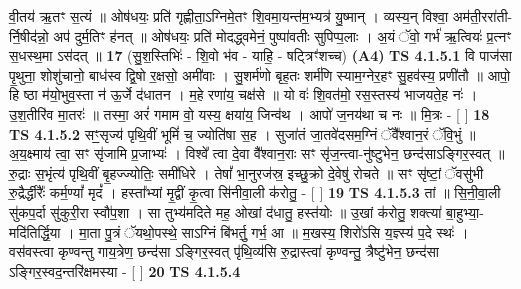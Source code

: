 \documentclass[17pt]{extarticle}
\begin{document}
                  वी॒तय॑ ऋ॒तꣳ स॒त्यं ॥ ओष॑धयः॒ प्रति॑ गृह्णीता॒ऽग्निमे॒तꣳ शि॒वमा॒यन्त॑म॒भ्यत्र॑ यु॒ष्मान् । व्यस्य॒न् विश्वा॒ अम॑ती॒ररा॑ती-र्नि॒षीद॑न्नो॒ अप॑ दुर्म॒तिꣳ ह॑नत् ॥ ओष॑धयः॒ प्रति॑ मोदद्ध्वमेनं॒ पुष्पा॑वतीः सुपिप्प॒लाः । अ॒यं ॅवो॒ गर्भ॑ ऋ॒त्वियः॑ प्र॒त्नꣳ स॒धस्थ॒मा ऽस॑दत् ॥ \textbf{  17} \newline
                  \newline
                      (सु॒श॒स्तिभिः॑ - शि॒वो भ॑व - याहि॒ - षट्त्रिꣳ॑शच्च)  \textbf{(A4)} \newline \newline
                                        \textbf{ TS 4.1.5.1} \newline
                  वि पाज॑सा पृ॒थुना॒ शोशु॑चानो॒ बाध॑स्व द्वि॒षो र॒क्षसो॒ अमी॑वाः । सु॒शर्म॑णो बृह॒तः शर्म॑णि स्याम॒ग्नेर॒हꣳ सु॒हव॑स्य॒ प्रणी॑तौ ॥ आपो॒ हि ष्ठा म॑यो॒भुव॒स्ता न॑ ऊ॒र्जे द॑धातन । म॒हे रणा॑य॒ चक्ष॑से ॥ यो वः॑ शि॒वत॑मो॒ रस॒स्तस्य॑ भाजयते॒ह नः॑ । उ॒श॒तीरि॑व मा॒तरः॑ ॥ तस्मा॒ अरं॑ गमाम वो॒ यस्य॒ क्षया॑य॒ जिन्व॑थ । आपो॑ ज॒नय॑था च नः ॥ मि॒त्रः - [  ] \textbf{  18} \newline
                  \newline
                                \textbf{ TS 4.1.5.2} \newline
                  सꣳ॒॒सृज्य॑ पृथि॒वीं भूमिं॑ च॒ ज्योति॑षा स॒ह । सुजा॑तं जा॒तवे॑दसम॒ग्निं ॅवै᳚श्वान॒रं ॅवि॒भुं ॥ अ॒य॒क्ष्माय॑ त्वा॒ सꣳ सृ॑जामि प्र॒जाभ्यः॑ । विश्वे᳚ त्वा दे॒वा वै᳚श्वान॒राः सꣳ सृ॑ज॒न्त्वा-नु॑ष्टुभेन॒ छन्द॑साऽङ्गिर॒स्वत् ॥ रु॒द्राः स॒भृंत्य॑ पृथि॒वीं बृ॒हज्ज्योतिः॒ समी॑धिरे । तेषां᳚ भा॒नुरज॑स्र॒ इच्छु॒क्रो दे॒वेषु॑ रोचते ॥ सꣳ सृ॑ष्टां॒ ॅवसु॑भी रु॒द्रैर्द्धीरैः᳚ कर्म॒ण्यां᳚ मृदं᳚ । हस्ता᳚भ्यां मृ॒द्वीं कृ॒त्वा सि॑नीवा॒ली क॑रोतु॒ - [  ] \textbf{  19} \newline
                  \newline
                                \textbf{ TS 4.1.5.3} \newline
                  तां ॥ सि॒नी॒वा॒ली सु॑कप॒र्दा सु॑कुरी॒रा स्वौ॑प॒शा । सा तुभ्य॑मदिते मह॒ ओखां द॑धातु॒ हस्त॑योः ॥ उ॒खां क॑रोतु॒ शक्त्या॑ बा॒हुभ्या॒-मदि॑तिर्द्धि॒या । मा॒ता पु॒त्रं ॅयथो॒पस्थे॒ साऽग्निं बि॑भर्तु॒ गर्भ॒ आ ॥ म॒खस्य॒ शिरो॑ऽसि य॒ज्ञ्स्य॑ प॒दे स्थः॑ । वस॑वस्त्वा कृण्वन्तु गाय॒त्रेण॒ छन्द॑सा ऽङ्गिर॒स्वत् पृ॑थि॒व्य॑सि रु॒द्रास्त्वा॑ कृण्वन्तु॒ त्रैष्टु॑भेन॒ छन्द॑सा ऽङ्गिर॒स्वद॒न्तरि॑क्षमस्या - [  ] \textbf{  20} \newline
                  \newline
                                \textbf{ TS 4.1.5.4} \newline
\end{document}
